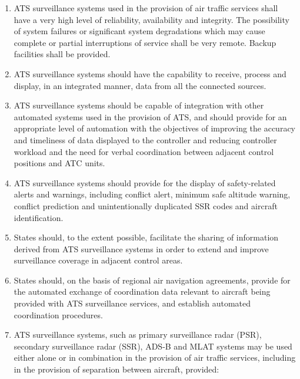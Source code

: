 \documentclass[../vATM.tex]{subfiles}
\begin{document}
    \begin{enumerate}[label=\arabic{section}.\arabic{subsection}.\arabic*]
        \item ATS surveillance systems used in the provision of air traffic services shall have a very high level of reliability, availability and integrity. The possibility of system failures or significant system degradations which may cause complete or partial interruptions of service shall be very remote. Backup facilities shall be provided.
        \item ATS surveillance systems should have the capability to receive, process and display, in an integrated manner, data from all the connected sources.
        \item ATS surveillance systems should be capable of integration with other automated systems used in the provision of ATS, and should provide for an appropriate level of automation with the objectives of improving the accuracy and timeliness of data displayed to the controller and reducing controller workload and the need for verbal coordination between adjacent control positions and ATC units.
        \item ATS surveillance systems should provide for the display of safety-related alerts and warnings, including conflict alert, minimum safe altitude warning, conflict prediction and unintentionally duplicated SSR codes and aircraft identification.
        \item States should, to the extent possible, facilitate the sharing of information derived from ATS surveillance systems in order to extend and improve surveillance coverage in adjacent control areas.
        \item States should, on the basis of regional air navigation agreements, provide for the automated exchange of coordination data relevant to aircraft being provided with ATS surveillance services, and establish automated coordination procedures.
        \item ATS surveillance systems, such as primary surveillance radar (PSR), secondary surveillance radar (SSR), ADS-B and MLAT systems may be used either alone or in combination in the provision of air traffic services, including in the provision of separation between aircraft, provided:


\end{enumerate}
\end{document}
